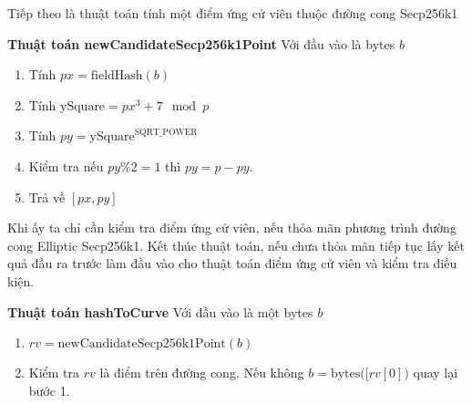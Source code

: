 \documentclass[../main.tex]{subfiles}
\begin{document}
Tiếp theo là thuật toán tính một điểm ứng cử viên thuộc đường cong Secp256k1

\textbf{Thuật toán newCandidateSecp256k1Point} Với đầu vào là bytes $b$
\begin{enumerate}
    \item Tính $px = \text{fieldHash}(b)$
    \item Tính $\text{ySquare} = px^3 + 7 \mod{p}$
    \item Tính $py = \text{ySquare}^{\text{SQRT\_POWER}}$
    \item Kiểm tra  nếu $py \% 2 = 1$ thì $py = p - py$.
    \item Trả về $[px,py]$
\end{enumerate}

Khi ấy ta chỉ cần kiểm tra điểm ứng cử viên, nếu thỏa mãn phương trình đường cong Elliptic Secp256k1. Kết thúc thuật toán, nếu chưa thỏa mãn tiếp tục lấy kết quả đầu ra trước làm đầu vào cho thuật toán điểm ứng cử viên và kiểm tra điều kiện.

\textbf{Thuật toán hashToCurve} Với đầu vào là một bytes $b$
\begin{enumerate}
    \item $rv = \text{newCandidateSecp256k1Point}(b)$
    \item Kiểm tra $rv$ là điểm trên đường cong. Nếu không $b = \text{bytes(}[rv[0])$ quay lại bước 1.
\end{enumerate}

\end{document}
